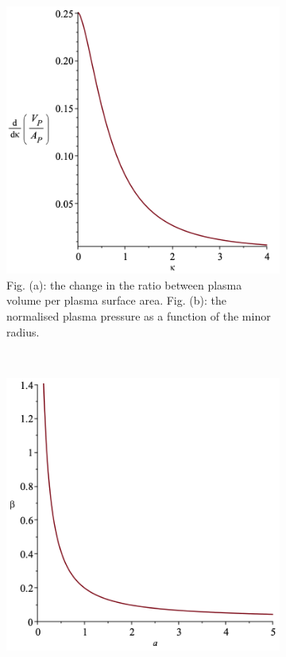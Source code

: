 \begin{figure}
	\centering
	\begin{subfigure}[h!]{.40\textwidth}
		\includegraphics[width=\textwidth]{Figures/kappa_change.png}
		\caption{Fig. (a): the change in the ratio between plasma volume per plasma surface area. Fig. (b): the normalised plasma pressure as a function of the minor radius.}
		\label{kappa_change}
	\end{subfigure}
	~
	\begin{subfigure}[h!]{.40\textwidth}
		\includegraphics[width=\textwidth]{Figures/beta_vs_a.png}
		\caption{}
		\label{beta_vs_a}
	\end{subfigure}
	\caption{}
	\label{A_kappa}
\end{figure}
